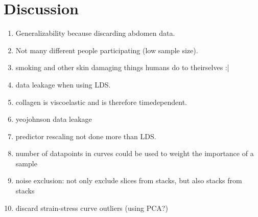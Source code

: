 \chapter{Discussion}

\begin{enumerate}
    \item Generalizability because discarding abdomen data.
    \item Not many different people participating (low sample size).
    \item smoking and other skin damaging things humans do to theirselves :|
    \item data leakage when using LDS.
    \item collagen is viscoelastic and is therefore timedependent.
    \item yeojohnson data leakage
    \item predictor rescaling not done more than LDS.
    \item number of datapoints in curves could be used to weight the importance of a sample
    \item noise exclusion: not only exclude slices from stacks, but also stacks from stacks
    \item discard strain-stress curve outliers (using PCA?)
\end{enumerate}